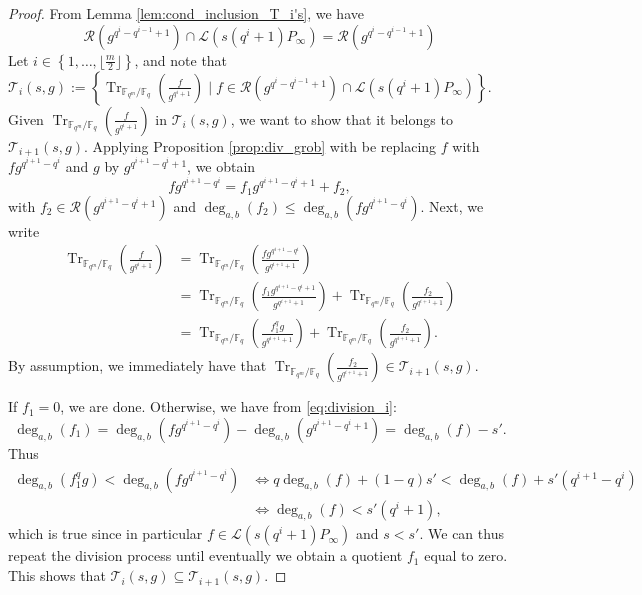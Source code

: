 \documentclass[a4paper]{article}
\theoremstyle{definition}
\theoremstyle{remark}
\newcommand{\calL}{\mathcal{L}}
\newcommand{\calR}{\mathcal{R}}
\newcommand{\calT}{\mathcal{T}}
\newcommand{\fq}{\mathbb{F}_{q}}
\newcommand{\Tr}[1]{\operatorname{Tr}_{\mathbb{F}_{q^m}/\fq}\left(#1\right)}
\newcommand{\set}[1]{\left\{#1\right\}}
\newcommand{\degab}[1]{\deg_{a,b}\left(#1\right)}
\begin{document}
\begin{proof}
From Lemma \ref{lem:cond_inclusion_T_i's}, we have
\begin{equation} \label{eq:equality_intersection}
  \calR(g^{q^{i}-q^{i-1}+1})\cap \calL(s(q^{i}+1)P_\infty) = \calR(g^{q^{i}-q^{i-1}+1}) 
\end{equation}
Let $i \in \set{1,\dots,\lfloor \frac{m}{2} \rfloor}$, and note that 
$\calT_i(s,g) := \set{\Tr{\frac{f}{g^{q^i+1}}} \mid f \in \calR(g^{q^i-q^{i-1}+1})\cap \calL(s(q^i+1)P_\infty)}.$ \\
Given $\Tr{\frac{f}{g^{q^i+1}}}$ in $\calT_i(s,g)$, we want to show that it belongs to $\calT_{i+1}(s,g)$. Applying Proposition \ref{prop:div_grob} with be replacing $f$ with $fg^{q^{i+1}-q^i}$ and $g$ by $g^{q^{i+1}-q^i+1}$, we obtain
\begin{equation} \label{eq:division_i}
fg^{q^{i+1}-q^i} = f_1g^{q^{i+1}-q^i+1} + f_2,
\end{equation}
with $f_2 \in \calR(g^{q^{i+1}-q^i+1})$ and $\degab{f_2} \leq \degab{fg^{q^{i+1}-q^i}}$. Next, we write
\begin{align*}
    \Tr{\frac{f}{g^{q^i+1}}} &= \Tr{\frac{fg^{q^{i+1}-q^i}}{g^{q^{i+1}+1}}} \\
                             &= \Tr{\frac{f_1g^{q^{i+1}-q^i+1}}{g^{q^{i+1}+1}}} + \Tr{\frac{f_2}{g^{q^{i+1}+1}}} \\
                             &= \Tr{\frac{f_1^qg}{g^{q^{i+1}+1}}} + \Tr{\frac{f_2}{g^{q^{i+1}+1}}}.
\end{align*}
By assumption, we immediately have that $\Tr{\frac{f_2}{g^{q^{i+1}+1}}} \in \calT_{i+1}(s,g).$

If $f_1=0$, we are done. Otherwise, we have from \eqref{eq:division_i}:
$$\degab{f_1} = \degab{fg^{q^{i+1}-q^i}} - \degab{g^{q^{i+1}-q^i+1}} = \degab{f}-s'.$$
Thus
\begin{align*}
     \degab{f_1^qg} < \degab{fg^{q^{i+1}-q^i}} & \iff q\degab{f} +(1-q)s' < \degab{f} +s'(q^{i+1}-q^i) \\
                                               & \iff \degab{f} < s'(q^{i}+1),
\end{align*}
which is true since in particular $f \in \calL(s(q^i+1)P_\infty)$ and $s<s'$. We can thus repeat the division process until eventually we obtain a quotient $f_1$ equal to zero. This shows that $\calT_i(s,g) \subseteq \calT_{i+1}(s,g)$.


\end{proof}
\end{document}
